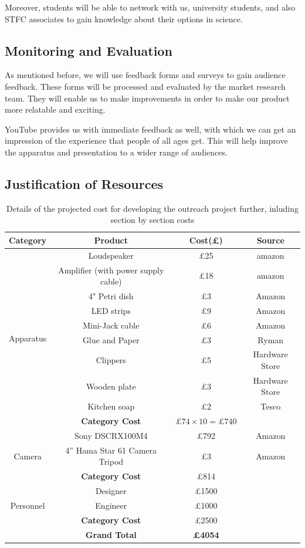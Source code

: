 Moreover, students will be able to network with us, university students, and also STFC associates to gain knowledge about their options in science. 

\subsection{Monitoring and Evaluation }

As mentioned before, we will use feedback forms and surveys to gain audience feedback. These forms will be processed and evaluated by the market research team. They will enable us to make improvements in order to make our product more relatable and exciting. 

YouTube provides us with immediate feedback as well, with which we can get an impression of the experience that people of all ages get. This will help improve the apparatus and presentation to a wider range of audiences. 


\subsection{Justification of Resources}
\bigskip
\begin{table}
\centering
\begin{tabular}{|c|c|c|c|}
\hline
\textbf{Category}& \textbf{Product} & \textbf{Cost(\pounds)} & \textbf{Source} \\
\hline
\multirow{10}{4em}{Apparatus} & Loudspeaker & \pounds25 & amazon\\
& Amplifier (with power supply cable) & \pounds18 & amazon \\ 
& 4" Petri dish & \pounds3 & Amazon\\
& LED strips & \pounds9 & Amazon\\
& Mini-Jack cable & \pounds6 & Amazon\\
& Glue and Paper & \pounds3 & Ryman\\
& Clippers & \pounds5 & Hardware Store\\
& Wooden plate & \pounds3 & Hardware Store\\
& Kitchen soap & \pounds2 & Tesco\\
& \textbf{Category Cost} & $ \pounds74 \times 10= \pounds 740$ &  \\
\hline
\multirow{3}{4em}{Camera} & Sony DSCRX100M4 & \pounds792 & Amazon\\
& 4'' Hama Star 61 Camera Tripod & \pounds3 & Amazon\\
& \textbf{Category Cost} & \pounds814 &  \\
\hline
\multirow{3}{4em}{Personnel} & Designer & \pounds1500 &  \\
& Engineer & \pounds1000 &  \\
& \textbf{Category Cost} & \pounds 2500 &  \\
\hline
\textbf{ }& \textbf{Grand Total} & \textbf{\pounds4054} &   \\
\hline

\end{tabular}
\caption{Details of the projected cost for developing the outreach project further, inluding section by section costs}
\label{table:STFC_costs}
\end{table}
\bigskip

